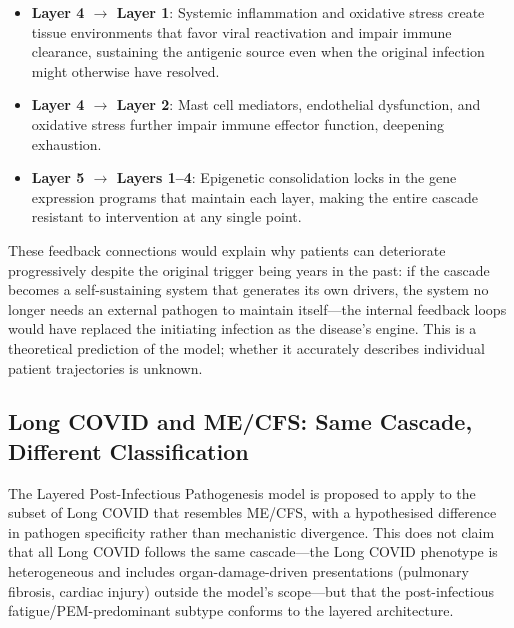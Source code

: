 \begin{itemize}
    \item \textbf{Layer 4 $\rightarrow$ Layer 1}: Systemic inflammation and oxidative stress create tissue environments that favor viral reactivation and impair immune clearance, sustaining the antigenic source even when the original infection might otherwise have resolved.
    \item \textbf{Layer 4 $\rightarrow$ Layer 2}: Mast cell mediators, endothelial dysfunction, and oxidative stress further impair immune effector function, deepening exhaustion.
    \item \textbf{Layer 5 $\rightarrow$ Layers 1--4}: Epigenetic consolidation locks in the gene expression programs that maintain each layer, making the entire cascade resistant to intervention at any single point.
\end{itemize}

These feedback connections would explain why patients can deteriorate progressively despite the original trigger being years in the past: if the cascade becomes a self-sustaining system that generates its own drivers, the system no longer needs an external pathogen to maintain itself---the internal feedback loops would have replaced the initiating infection as the disease's engine. This is a theoretical prediction of the model; whether it accurately describes individual patient trajectories is unknown.

\subsection{Long COVID and ME/CFS: Same Cascade, Different Classification}

The Layered Post-Infectious Pathogenesis model is proposed to apply to the subset of Long COVID that resembles ME/CFS, with a hypothesised difference in pathogen specificity rather than mechanistic divergence. This does not claim that all Long COVID follows the same cascade---the Long COVID phenotype is heterogeneous and includes organ-damage-driven presentations (pulmonary fibrosis, cardiac injury) outside the model's scope---but that the post-infectious fatigue/PEM-predominant subtype conforms to the layered architecture.

